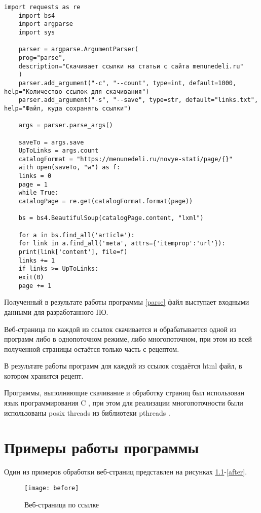 \begin{lstlisting}[label=parse,caption={parse.py -- скрипт для получения ссылок с рецептами,}]
	import requests as re
	import bs4
	import argparse
	import sys
	
	parser = argparse.ArgumentParser(
	prog="parse",
	description="Скачивает ссылки на статьи с сайта menunedeli.ru"
	)
	parser.add_argument("-c", "--count", type=int, default=1000, help="Количество ссылок для скачивания")
	parser.add_argument("-s", "--save", type=str, default="links.txt", help="Файл, куда сохранять ссылки")
	
	args = parser.parse_args()
	
	saveTo = args.save
	UpToLinks = args.count
	catalogFormat = "https://menunedeli.ru/novye-stati/page/{}"
	with open(saveTo, "w") as f:
	links = 0
	page = 1
	while True:
	catalogPage = re.get(catalogFormat.format(page))
	
	bs = bs4.BeautifulSoup(catalogPage.content, "lxml")
	
	for a in bs.find_all('article'):
	for link in a.find_all('meta', attrs={'itemprop':'url'}):
	print(link['content'], file=f)
	links += 1
	if links >= UpToLinks:
	exit(0)
	page += 1
\end{lstlisting}

Полученный в результате работы программы \ref{parse} файл выступает входными данными для разработанного ПО.

Веб-страница по каждой из ссылок скачивается и обрабатывается одной из программ либо в однопоточном режиме, либо многопоточном, при этом из всей полученной страницы остаётся только часть с рецептом.

В результате работы программ для каждой из ссылок создаётся html файл, в котором хранится рецепт.

Программы, выполняющие скачивание и обработку страниц был использован язык программирования C \cite{C}, при этом для реализации многопоточности были использованы posix threads из библиотеки pthreads \cite{pthreads}.

\vspace{20mm}
{\let\clearpage\relax \chapter{Примеры работы программы}}

Один из примеров обработки веб-страниц \cite{receipt} представлен на рисунках \ref{before}-\ref{after}.

\begin{figure}[h]
	\centering
	\texttt{[image: before]}
	\caption{Веб-страница по ссылке \cite{receipt}}
	\label{before}
\end{figure}

